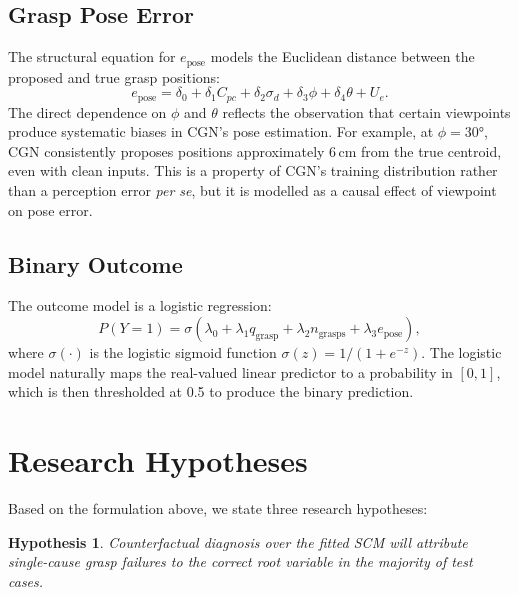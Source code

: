 \documentclass[11pt,a4paper]{report}
\newtheorem{hypothesis}{Hypothesis}[chapter]
\begin{document}
\subsection{Grasp Pose Error}

The structural equation for $e_{\text{pose}}$ models the Euclidean distance between the proposed and true grasp positions:
\begin{equation}
  e_{\text{pose}} = \delta_0 + \delta_1 C_{pc} + \delta_2 \sigma_d
                    + \delta_3 \phi + \delta_4 \theta + U_e.
  \label{eq:ep}
\end{equation}
The direct dependence on $\phi$ and $\theta$ reflects the observation that certain viewpoints produce systematic biases in CGN's pose estimation. For example, at $\phi = 30°$, CGN consistently proposes positions approximately 6\,cm from the true centroid, even with clean inputs. This is a property of CGN's training distribution rather than a perception error \emph{per se}, but it is modelled as a causal effect of viewpoint on pose error.

\subsection{Binary Outcome}

The outcome model is a logistic regression:
\begin{equation}
  P(Y = 1) = \sigma\!\left(\lambda_0 + \lambda_1 q_{\text{grasp}}
              + \lambda_2 n_{\text{grasps}} + \lambda_3 e_{\text{pose}}\right),
  \label{eq:Y}
\end{equation}
where $\sigma(\cdot)$ is the logistic sigmoid function $\sigma(z) = 1/(1 + e^{-z})$. The logistic model naturally maps the real-valued linear predictor to a probability in $[0, 1]$, which is then thresholded at 0.5 to produce the binary prediction.

\section{Research Hypotheses}
\label{sec:hypotheses}

Based on the formulation above, we state three research hypotheses:

\begin{hypothesis}
  Counterfactual diagnosis over the fitted SCM will attribute single-cause grasp failures to the correct root variable in the majority of test cases.
  \label{hyp:accuracy}
\end{hypothesis}
\end{document}
